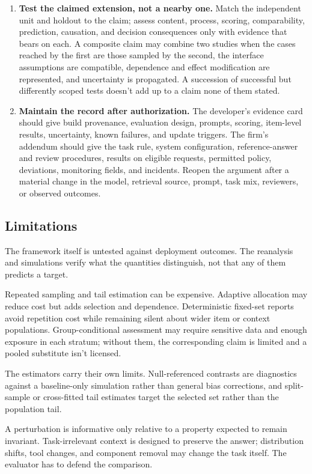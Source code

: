 \documentclass[12pt]{article}
\begin{document}
\begin{enumerate}
\item \textbf{Test the claimed extension, not a nearby one.} Match the independent unit and holdout to the claim; assess content, process, scoring, comparability, prediction, causation, and decision consequences only with evidence that bears on each. A composite claim may combine two studies when the cases reached by the first are those sampled by the second, the interface assumptions are compatible, dependence and effect modification are represented, and uncertainty is propagated. A succession of successful but differently scoped tests doesn't add up to a claim none of them stated.
\item \textbf{Maintain the record after authorization.} The developer's evidence card should give build provenance, evaluation design, prompts, scoring, item-level results, uncertainty, known failures, and update triggers. The firm's addendum should give the task rule, system configuration, reference-answer and review procedures, results on eligible requests, permitted policy, deviations, monitoring fields, and incidents. Reopen the argument after a material change in the model, retrieval source, prompt, task mix, reviewers, or observed outcomes.
\end{enumerate}

\subsection{Limitations}\label{sec:limitations}

The framework itself is untested against deployment outcomes. The reanalysis and simulations verify what the quantities distinguish, not that any of them predicts a target.

Repeated sampling and tail estimation can be expensive. Adaptive allocation may reduce cost but adds selection and dependence. Deterministic fixed-set reports avoid repetition cost while remaining silent about wider item or context populations. Group-conditional assessment may require sensitive data and enough exposure in each stratum; without them, the corresponding claim is limited and a pooled substitute isn't licensed.

The estimators carry their own limits. Null-referenced contrasts are diagnostics against a baseline-only simulation rather than general bias corrections, and split-sample or cross-fitted tail estimates target the selected set rather than the population tail.

A perturbation is informative only relative to a property expected to remain invariant. Task-irrelevant context is designed to preserve the answer; distribution shifts, tool changes, and component removal may change the task itself. The evaluator has to defend the comparison.
\end{document}
